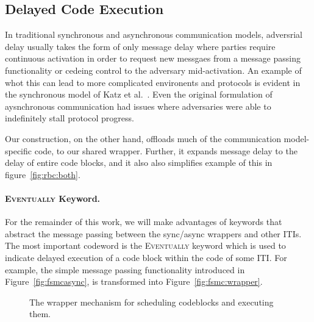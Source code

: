 \subsection{Delayed Code Execution}
In traditional synchronous and asynchronous communication models, adversrial delay usually takes the form of only message delay where parties require continuous activation in order to request new messgaes from a message passing functionality or cedeing control to the adversary mid-activation.
An example of whot this can lead to more complicated environents and protocols is evident in the synchronous model of Katz et al.~\cite{katzclock}. 
Even the original formulation of aysnchronous communication had issues where adversaries were able to indefinitely stall protocol progress.

Our construction, on the other hand, offloads much of the communication model-specific code, to our shared wrapper.
Further, it expands message delay to the delay of entire code blocks, and it also also simplifies
example of this in figure~\ref{fig:rbc:both}.


\paragraph{\textsc{Eventually} Keyword.}
For the remainder of this work, we will make advantages of keywords that abstract the message passing between the sync/async wrappers and other ITIs.
The most important codeword is the \textsc{Eventually} keyword which is used to indicate delayed execution of a code block within the code of some ITI.
For example, the simple message passing functionality introduced in Figure~\ref{fig:fsmcasync}, is transformed into Figure~\ref{fig:fsmc:wrapper}.

\begin{figure}

\caption{The wrapper mechanism for scheduling codeblocks and executing them.}
\label{fig:asyncwrapper:short}
\end{figure}
